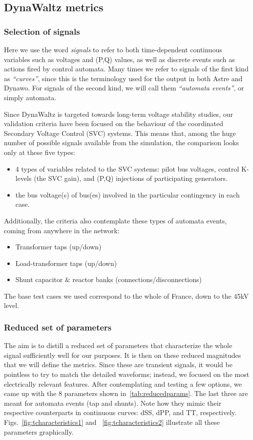 \documentclass[conference]{IEEEtran}
\begin{document}
\subsection{DynaWaltz metrics}

\subsubsection{Selection of signals}
Here we use the word \emph{signals} to refer to both time-dependent continuous
variables such as voltages and (P,Q) values, as well as discrete events such as
actions fired by control automata.  Many times we refer to signals of the
first kind as \emph{``curves''}, since this is the terminology used for the
output in both Astre and Dynawo. For signals of the second kind, we will
call them \emph{``automata events''}, or simply automata.

Since DynaWaltz is targeted towards long-term voltage stability studies, our
validation criteria have been focused on the behaviour of the coordinated
Secondary Voltage Control (SVC) systems. This means that, among the huge number
of possible signals available from the simulation, the comparison looks only at
these five types:
\begin{itemize}
  \item 4 types of variables related to the SVC systems: pilot bus voltages,
        control K-levels (the SVC gain), and (P,Q) injections of participating
        generators.
  \item the bus voltage(s) of bus(es) involved in the particular
        contingency in each case.
\end{itemize}
Additionally, the criteria also contemplate these types of automata events,
coming from anywhere in the network:
\begin{itemize}
  \item Transformer taps (up/down)
  \item Load-transformer taps (up/down)
  \item Shunt capacitor \& reactor banks  (connections/disconnections)
\end{itemize}
The base test cases we used correspond to the whole of France, down to the 45kV
level.


\subsubsection{Reduced set of parameters}
The aim is to distill a reduced set of parameters that characterize the whole
signal sufficiently well for our purposes. It is then on these reduced
magnitudes that we will define the metrics.  Since these are transient signals,
it would be pointless to try to match the detailed waveforms; instead, we
focused on the most electrically relevant features.  After contemplating and
testing a few options, we came up with the 8 parameters shown
in~\ref{tab:reducedparams}. The last three are meant for automata events (tap
and shunts). Note how they mimic their respective counterparts in continuous
curves: dSS, dPP, and TT, respectively. Figs.~\ref{fig:tcharacteristics1} and
~\ref{fig:tcharacteristics2} illustrate all these parameters graphically.
\end{document}
